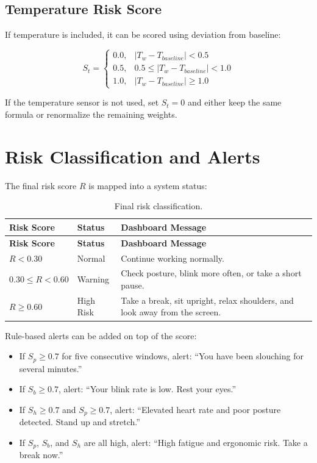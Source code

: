 \documentclass[11pt,a4paper]{article}
\begin{document}
\subsection{Temperature Risk Score}
If temperature is included, it can be scored using deviation from baseline:

\begin{equation}
S_t =
\begin{cases}
0.0, & |T_w - T_{baseline}| < 0.5 \\
0.5, & 0.5 \leq |T_w - T_{baseline}| < 1.0 \\
1.0, & |T_w - T_{baseline}| \geq 1.0
\end{cases}
\end{equation}

If the temperature sensor is not used, set $S_t = 0$ and either keep the same formula or renormalize the remaining weights.

\section{Risk Classification and Alerts}

The final risk score $R$ is mapped into a system status:

\begin{longtable}{p{}p{}p{}}
\caption{Final risk classification.}\\
\toprule
\textbf{Risk Score} & \textbf{Status} & \textbf{Dashboard Message} \\
\midrule
\endfirsthead
\toprule
\textbf{Risk Score} & \textbf{Status} & \textbf{Dashboard Message} \\
\midrule
\endhead
$R < 0.30$ & Normal & Continue working normally. \\
$0.30 \leq R < 0.60$ & Warning & Check posture, blink more often, or take a short pause. \\
$R \geq 0.60$ & High Risk & Take a break, sit upright, relax shoulders, and look away from the screen. \\
\bottomrule
\end{longtable}

Rule-based alerts can be added on top of the score:

\begin{itemize}[leftmargin=*]
    \item If $S_p \geq 0.7$ for five consecutive windows, alert: ``You have been slouching for several minutes.''
    \item If $S_b \geq 0.7$, alert: ``Your blink rate is low. Rest your eyes.''
    \item If $S_h \geq 0.7$ and $S_p \geq 0.7$, alert: ``Elevated heart rate and poor posture detected. Stand up and stretch.''
    \item If $S_p$, $S_b$, and $S_h$ are all high, alert: ``High fatigue and ergonomic risk. Take a break now.''
\end{itemize}
\end{document}
